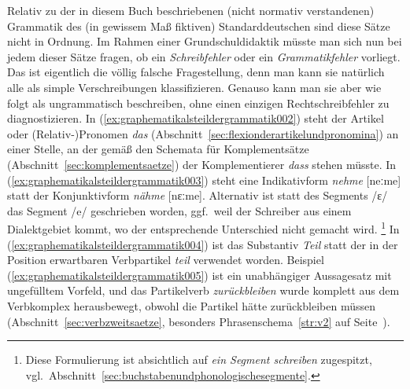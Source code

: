 \begin{exe}
  \ex\label{ex:graphematikalsteildergrammatik001}
  \begin{xlist}
  \end{xlist}
\end{exe}

Relativ zu der in diesem Buch beschriebenen (nicht normativ verstandenen) Grammatik des (in gewissem Maß fiktiven) Standarddeutschen sind diese Sätze nicht in Ordnung.
Im Rahmen einer Grundschuldidaktik müsste man sich nun bei jedem dieser Sätze fragen, ob ein \textit{Schreibfehler} oder ein \textit{Grammatikfehler} vorliegt.
Das ist eigentlich die völlig falsche Fragestellung, denn man kann sie natürlich alle als simple Verschreibungen klassifizieren.
Genauso kann man sie aber wie folgt als ungrammatisch beschreiben, ohne einen einzigen Rechtschreibfehler zu diagnostizieren.
In (\ref{ex:graphematikalsteildergrammatik002}) steht der Artikel oder (Relativ-)Pronomen \textit{das} (Abschnitt~\ref{sec:flexionderartikelundpronomina}) an einer Stelle, an der gemäß den Schemata für Komplementsätze (Abschnitt~\ref{sec:komplementsaetze}) der Komplementierer \textit{dass} stehen müsste.
In (\ref{ex:graphematikalsteildergrammatik003}) steht eine Indikativform \textit{nehme} [neːme] statt der Konjunktivform \textit{nähme} [nɛːme].
Alternativ ist statt des Segments /ɛ/ das Segment /e/ geschrieben worden, ggf.\ weil der Schreiber aus einem Dialektgebiet kommt, wo der entsprechende Unterschied nicht gemacht wird.%
\footnote{Diese Formulierung ist absichtlich auf \textit{ein Segment schreiben} zugespitzt, vgl.\ Abschnitt~\ref{sec:buchstabenundphonologischesegmente}.}
In (\ref{ex:graphematikalsteildergrammatik004}) ist das Substantiv \textit{Teil} statt der in der Position erwartbaren Verbpartikel \textit{teil} verwendet worden.
Beispiel (\ref{ex:graphematikalsteildergrammatik005}) ist ein unabhängiger Aussagesatz mit ungefülltem Vorfeld, und das Partikelverb \textit{zurückbleiben} wurde komplett aus dem Verbkomplex herausbewegt, obwohl die Partikel hätte zurückbleiben müssen (Abschnitt~\ref{sec:verbzweitsaetze}, besonders Phrasenschema~\ref{str:v2} auf Seite~\pageref{str:v2}).
